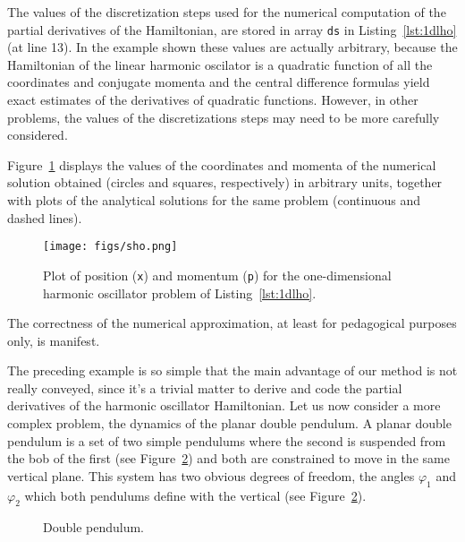 \documentclass{iopart}
\begin{document}
The values of the discretization steps used for the numerical computation of the
partial derivatives of the Hamiltonian, are stored in array \texttt{ds} in
Listing~\ref{lst:1dlho} (at line 13).  In the example shown these values are
actually arbitrary, because the Hamiltonian of the linear harmonic oscilator is a
quadratic function of all the coordinates and conjugate momenta and the central
difference formulas yield exact estimates of the derivatives of quadratic
functions. However, in other problems, the values of the discretizations steps
may need to be more carefully considered.

Figure~\ref{fig:1dlho} displays the values of the  coordinates and momenta of
the numerical solution obtained (circles and squares, respectively) in arbitrary
units, together with plots of the analytical solutions for the same problem
(continuous and dashed lines).
\begin{figure}[htb]
  \begin{center}
    \texttt{[image: figs/sho.png]}
  \end{center}
  \caption{Plot of position (\texttt{x}) and momentum (\texttt{p}) for the
  one-dimensional harmonic oscillator problem of Listing~\ref{lst:1dlho}.
  }\label{fig:1dlho}
\end{figure}
The correctness of the numerical approximation, at least for pedagogical
purposes only, is manifest.

The preceding example is so simple that the main advantage of our method is not
really conveyed, since it's a trivial matter to derive and code the partial
derivatives of the harmonic oscillator Hamiltonian. Let us now consider a more
complex problem, the dynamics of the planar double pendulum. A planar double
pendulum is a set of two simple pendulums where the second is suspended from the
bob of the first (see Figure~\ref{fig:b}) and both are constrained to move in
the same vertical plane. This system has two obvious degrees of freedom, the
angles $\varphi_1$ and $\varphi_2$ which both pendulums define with the vertical
(see Figure~\ref{fig:b}).
\begin{figure}[htb]
  {\centering
    \caption{\label{fig:b}Double pendulum.}
  }\par
\end{figure}
\end{document}
